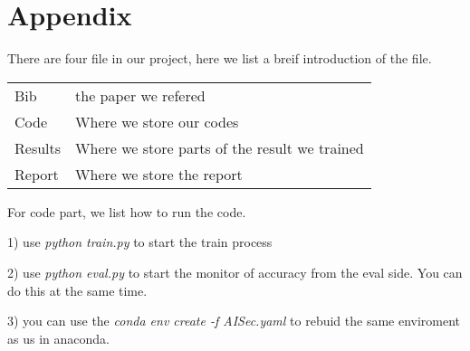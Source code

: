 \documentclass[
	letterpaper, %
	10pt, %
]{CSUniSchoolLabReport}
\begin{document}
\section{Appendix}
There are four file in our project, here we list a breif introduction of the file.

\begin{tabular}{l l}
	Bib & {the paper we refered} \\
	Code & {Where we store our codes} \\
	Results & {Where we store parts of the result we trained} \\
	Report & {Where we store the report}
\end{tabular}

For code part, we list how to run the code.

1) use \emph{python train.py} to start the train process

2) use \emph{python eval.py} to start the monitor of accuracy from the eval side. You can do this at the same time.

3) you can use the \emph{conda env create -f AISec.yaml} to rebuid the same enviroment as us in anaconda.






\printbibliography %

\end{document}
